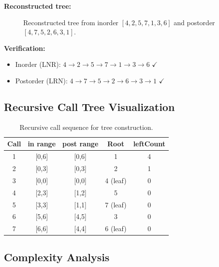 \documentclass[10pt,journal,compsoc,onecolumn]{IEEEtran}
\begin{document}
\textbf{Reconstructed tree:}

\begin{figure}[htbp]
\centering
{}
\caption{Reconstructed tree from inorder $[4,2,5,7,1,3,6]$ and postorder $[4,7,5,2,6,3,1]$.}
\end{figure}

\textbf{Verification:}
\begin{itemize}
    \item Inorder (LNR): $4 \to 2 \to 5 \to 7 \to 1 \to 3 \to 6$ $\checkmark$
    \item Postorder (LRN): $4 \to 7 \to 5 \to 2 \to 6 \to 3 \to 1$ $\checkmark$
\end{itemize}

\subsection{Recursive Call Tree Visualization}

\begin{table}[htbp]
\centering
\begin{tabular}{|c|c|c|c|c|}
\hline
\textbf{Call} & \textbf{in range} & \textbf{post range} & \textbf{Root} & \textbf{leftCount} \\
\hline
1 & [0,6] & [0,6] & 1 & 4 \\
2 & [0,3] & [0,3] & 2 & 1 \\
3 & [0,0] & [0,0] & 4 (leaf) & 0 \\
4 & [2,3] & [1,2] & 5 & 0 \\
5 & [3,3] & [1,1] & 7 (leaf) & 0 \\
6 & [5,6] & [4,5] & 3 & 0 \\
7 & [6,6] & [4,4] & 6 (leaf) & 0 \\
\hline
\end{tabular}
\caption{Recursive call sequence for tree construction.}
\end{table}

\subsection{Complexity Analysis}
\end{document}
